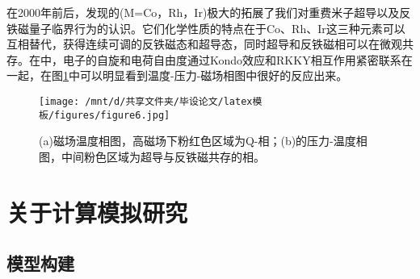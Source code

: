 在2000年前后，发现的(M=Co，Rh，Ir)极大的拓展了我们对重费米子超导以及反铁磁量子临界行为的认识。它们化学性质的特点在于Co、Rh、Ir这三种元素可以互相替代，获得连续可调的反铁磁态和超导态，同时超导和反铁磁相可以在微观共存。在中，电子的自旋和电荷自由度通过Kondo效应和RKKY相互作用紧密联系在一起，在图\ref{fig4}中可以明显看到温度-压力-磁场相图中很好的反应出来。
\begin{figure}[h]
    \texttt{[image: /mnt/d/共享文件夹/毕设论文/latex模板/figures/figure6.jpg]}
    \caption{(a)磁场温度相图，高磁场下粉红色区域为Q-相；(b)的压力-温度相图，中间粉色区域为超导与反铁磁共存的相\cite{9}。}
    \label{fig4}
\end{figure}









\section{关于计算模拟研究}
\subsection{模型构建}
